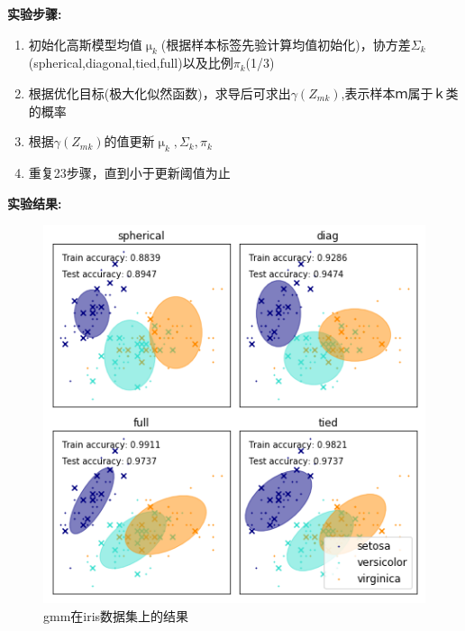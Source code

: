 \documentclass{article}
\begin{document}
\textbf{实验步骤:}
\begin{enumerate}
\item 初始化高斯模型均值$\upmu_k$(根据样本标签先验计算均值初始化)，协方差$\Sigma_k$(spherical,diagonal,tied,full)以及比例$\pi_k$(1/3)
\item 根据优化目标(极大化似然函数)，求导后可求出$\gamma(Z_{mk})$,表示样本ｍ属于ｋ类的概率
\item 根据$\gamma(Z_{mk})$的值更新$\upmu_k,\Sigma_k,\pi_k$
\item 重复23步骤，直到小于更新阈值为止
\end{enumerate}
\textbf{实验结果:}
\begin{figure}[htbp]
	\centering\includegraphics[scale=1.1]{gmm_iris}
	\caption{gmm在iris数据集上的结果}
\end{figure}

\end{document}
